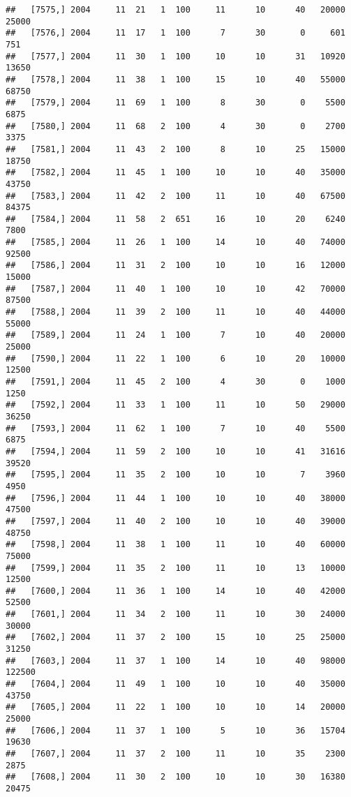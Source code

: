 \documentclass{article}\usepackage[]{graphicx}\usepackage[]{color}
\makeatletter
\newenvironment{kframe}{%
 \def\at@end@of@kframe{}%
 \ifinner\ifhmode%
  \def\at@end@of@kframe{\end{minipage}}%
  \begin{minipage}{\columnwidth}%
 \fi\fi%
 \def\FrameCommand##1{\hskip\@totalleftmargin \hskip-\fboxsep
 \colorbox{shadecolor}{##1}\hskip-\fboxsep
     \hskip-\linewidth \hskip-\@totalleftmargin \hskip\columnwidth}%
 \MakeFramed {\advance\hsize-\width
   \@totalleftmargin\z@ \linewidth\hsize
   \@setminipage}}%
 {\par\unskip\endMakeFramed%
 \at@end@of@kframe}
\newenvironment{knitrout}{}{} %
\makeatother
\begin{document}
\begin{knitrout}
\begin{kframe}
\begin{verbatim}
##   [7575,] 2004     11  21   1  100     11      10      40   20000   25000
##   [7576,] 2004     11  17   1  100      7      30       0     601     751
##   [7577,] 2004     11  30   1  100     10      10      31   10920   13650
##   [7578,] 2004     11  38   1  100     15      10      40   55000   68750
##   [7579,] 2004     11  69   1  100      8      30       0    5500    6875
##   [7580,] 2004     11  68   2  100      4      30       0    2700    3375
##   [7581,] 2004     11  43   2  100      8      10      25   15000   18750
##   [7582,] 2004     11  45   1  100     10      10      40   35000   43750
##   [7583,] 2004     11  42   2  100     11      10      40   67500   84375
##   [7584,] 2004     11  58   2  651     16      10      20    6240    7800
##   [7585,] 2004     11  26   1  100     14      10      40   74000   92500
##   [7586,] 2004     11  31   2  100     10      10      16   12000   15000
##   [7587,] 2004     11  40   1  100     10      10      42   70000   87500
##   [7588,] 2004     11  39   2  100     11      10      40   44000   55000
##   [7589,] 2004     11  24   1  100      7      10      40   20000   25000
##   [7590,] 2004     11  22   1  100      6      10      20   10000   12500
##   [7591,] 2004     11  45   2  100      4      30       0    1000    1250
##   [7592,] 2004     11  33   1  100     11      10      50   29000   36250
##   [7593,] 2004     11  62   1  100      7      10      40    5500    6875
##   [7594,] 2004     11  59   2  100     10      10      41   31616   39520
##   [7595,] 2004     11  35   2  100     10      10       7    3960    4950
##   [7596,] 2004     11  44   1  100     10      10      40   38000   47500
##   [7597,] 2004     11  40   2  100     10      10      40   39000   48750
##   [7598,] 2004     11  38   1  100     11      10      40   60000   75000
##   [7599,] 2004     11  35   2  100     11      10      13   10000   12500
##   [7600,] 2004     11  36   1  100     14      10      40   42000   52500
##   [7601,] 2004     11  34   2  100     11      10      30   24000   30000
##   [7602,] 2004     11  37   2  100     15      10      25   25000   31250
##   [7603,] 2004     11  37   1  100     14      10      40   98000  122500
##   [7604,] 2004     11  49   1  100     10      10      40   35000   43750
##   [7605,] 2004     11  22   1  100     10      10      14   20000   25000
##   [7606,] 2004     11  37   1  100      5      10      36   15704   19630
##   [7607,] 2004     11  37   2  100     11      10      35    2300    2875
##   [7608,] 2004     11  30   2  100     10      10      30   16380   20475

\end{verbatim}
\end{kframe}
\end{knitrout}
\end{document}
